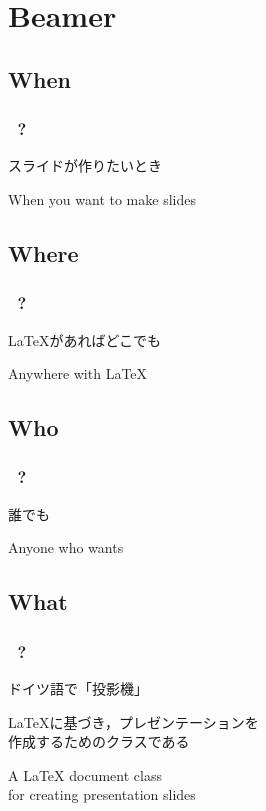 \documentclass[./main]{subfiles}
\begin{document}
\setcounter{section}{0}
\section{Beamer}
\subsection{When}
\begin{frame}
  \frametitle{\subsecname\ \secname ?}

  \centering
  スライドが作りたいとき

  \vspace{1ex}

  When you want to make slides

\end{frame}


\subsection{Where}
\begin{frame}
  \frametitle{\subsecname\ \secname ?}

  \centering

  \LaTeX があればどこでも

  \vspace{1ex}

  Anywhere with \LaTeX

\end{frame}


\subsection{Who}
\begin{frame}
  \frametitle{\subsecname\ \secname ?}

  \centering

  誰でも

  \vspace{1ex}

  Anyone who wants

\end{frame}


\subsection{What}
\begin{frame}[fragile]
  \frametitle{\subsecname\ \secname ?}

  \centering

  ドイツ語で「投影機」

  \vspace{1ex}

  \LaTeX に基づき，プレゼンテーションを\\
  作成するためのクラスである\citep{WikiBeamerJa}

  \vspace{1ex}

  A LaTeX document class \\
  for creating presentation slides \citep{WikiBeamerEn}


\end{frame}
\end{document}
